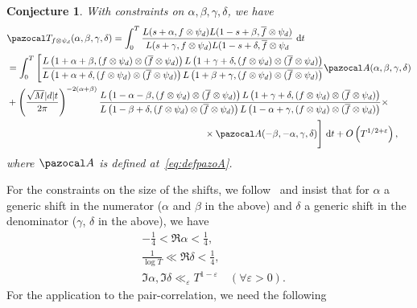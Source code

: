 \documentclass[11pt,reqno]{amsart} \usepackage{fullpage}
\newtheorem{conjecture}{Conjecture}
\newcommand{\vep}{\varepsilon}
\renewcommand{\d}[1]{\,\operatorname*{d}\!{#1}}
\newcommand\be{\begin{equation}}
\newcommand\ee{\end{equation}}
\newcommand{\T}{\pazocal T_{f\otimes\psi_d}(\alpha,\beta,\gamma,\delta)}
\numberwithin{equation}{section}
\begin{document}
\begin{conjecture}\label{conj:pairratios}
  With constraints on $\alpha,\beta,\gamma,\delta$, we have
  \be\begin{aligned}[t]
    &\T=\int_0^T\frac{L(s+\alpha,f\otimes\psi_d)L(1-s+\beta,\overline f\otimes\psi_d)}
    {L(s+\gamma,f\otimes\psi_d)L(1-s+\delta,\overline f\otimes\psi_d}\d t \\
    &=\int_0^T\Bigg[
    \frac{L\left(1+\alpha+\beta,(f\otimes\psi_d)\otimes(\overline f\otimes\psi_d)\right)
      L\left(1+\gamma+\delta,(f\otimes\psi_d)\otimes(\overline f\otimes\psi_d)\right)}
    {L\left(1+\alpha+\delta,(f\otimes\psi_d)\otimes(\overline f\otimes\psi_d)\right)
      L\left(1+\beta+\gamma,(f\otimes\psi_d)\otimes(\overline f\otimes\psi_d)\right)}
    \pazocal A(\alpha,\beta,\gamma,\delta) \\
    &\begin{multlined}+\left(\frac{\sqrt M|d|t}{2\pi}\right)^{-2(\alpha+\beta)}
    \frac{L\left(1-\alpha-\beta,(f\otimes\psi_d)\otimes(\overline f\otimes\psi_d)\right)
      L\left(1+\gamma+\delta,(f\otimes\psi_d)\otimes(\overline f\otimes\psi_d)\right)}
    {L\left(1-\beta+\delta,(f\otimes\psi_d)\otimes(\overline f\otimes\psi_d)\right)
      L\left(1-\alpha+\gamma,(f\otimes\psi_d)\otimes(\overline f\otimes\psi_d)\right)}
    \times \\ \times
    \pazocal A(-\beta,-\alpha,\gamma,\delta)\Bigg]\d t
    +O\left(T^{1/2+\vep}\right),\end{multlined}
  \end{aligned}\ee
  where $\pazocal A$ is defined at~\eqref{eq:defpazoA}.
\end{conjecture}
For the constraints on the size of the shifts, we follow~\cite{CS} and insist that for
$\alpha$ a generic shift in the numerator ($\alpha$ and $\beta$ in the above) and $\delta$
a generic shift in the denominator ($\gamma$, $\delta$ in the above), we have
\begin{align}
  &-\frac14<\Re\alpha<\frac14,\\ &\frac1{\log T}\ll\Re\delta<\frac14, \\
  &\Im\alpha,\Im\delta\ll_\vep T^{1-\vep}\quad(\forall\vep>0).
\end{align}
For the application to the pair-correlation, we need the following
\end{document}

